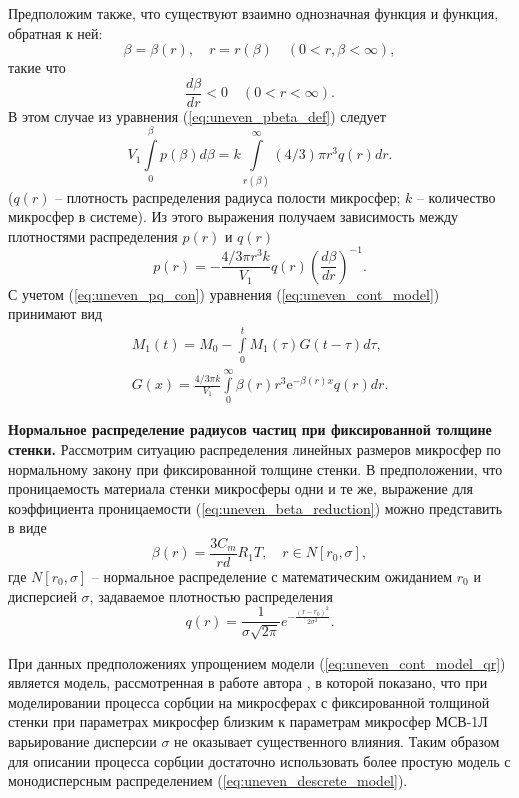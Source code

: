Предположим также, что существуют взаимно однозначная функция и функция, обратная к ней:
\begin{equation*}
\label{eq:uneven_betar_con}
\beta = \beta(r), \quad r=r(\beta) \quad (0 < r, \beta < \infty),
\end{equation*}
такие что 
\[
\frac{d\beta}{dr} < 0 \quad (0 < r < \infty).
\]
В этом случае из уравнения (\ref{eq:uneven_pbeta_def})  следует
\begin{equation*}
V_1 \int\limits_0^{\beta}p(\beta)d\beta = k \int\limits_{r(\beta)}^{\infty}(4/3)\pi r^3 q(r) dr.
\end{equation*}
($q(r)$ -- плотность распределения радиуса полости микросфер; $k$ -- количество микросфер в системе). Из этого выражения получаем зависимость между плотностями распределения $p(r)$ и $q(r)$
\begin{equation}
\label{eq:uneven_pq_con}
p(r) = - \frac{4/3 \pi r^3 k}{V_1}  q(r) \left( \frac{d\beta}{dr} \right)^{-1}.
\end{equation}
С учетом (\ref{eq:uneven_pq_con}) уравнения (\ref{eq:uneven_cont_model}) принимают вид
\begin{equation}
\label{eq:uneven_cont_model_qr}
\begin{array}{c}
M_1(t)=M_0-\int\limits_{0}^{t}  M_1(\tau)  G(t-\tau) d\tau, \\
G(x) = \displaystyle\frac{4/3 \pi k}{V_1} \int\limits_{0}^{\infty}\beta(r) r^3  \mathrm{e}^{-\beta(r) x} q(r) dr.
\end{array}
\end{equation}

\textbf{Нормальное распределение радиусов частиц при фиксированной толщине стенки.}
Рассмотрим ситуацию распределения линейных размеров микросфер по нормальному закону при фиксированной толщине стенки.  В предположении, что проницаемость материала стенки микросферы одни и те же, выражение для коэффициента проницаемости (\ref{eq:uneven_beta_reduction})  можно представить в виде
\[
\beta(r) = \frac{3 C_m}{r d} R_1 T, \quad r \in N[r_0, \sigma],
\]
где $N[r_0, \sigma]$ -- нормальное распределение с математическим ожиданием $r_0$ и дисперсией $\sigma$, задаваемое плотностью распределения 
\[
q(r) = \frac{1}{\sigma\sqrt{2\pi}}e^{-\displaystyle\frac{(r-r_0)^2}{2\sigma^2}}.
\]

При данных предположениях упрощением модели (\ref{eq:uneven_cont_model_qr})  является модель, рассмотренная в работе автора \cite{Ver_Norm_Dist}, в которой показано, что при моделировании процесса сорбции на микросферах с фиксированной толщиной стенки при параметрах микросфер близким к параметрам микросфер МСВ-1Л варьирование дисперсии $\sigma$ не оказывает существенного влияния. Таким образом для описании процесса сорбции достаточно использовать более простую модель с монодисперсным распределением (\ref{eq:uneven_descrete_model}).


